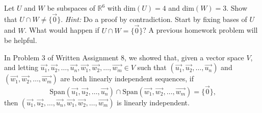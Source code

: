 \documentclass[12pt]{article}
\newenvironment{problem}[2][Problem]
{
	\begin{trivlist} 
		\item[\hskip \labelsep {\bfseries #1 #2:}]
	}
{
	\end{trivlist}
	}
\newenvironment{solution}[1][Solution]
{
	\begin{trivlist} 
		\item[\hskip \labelsep {\itshape #1:}]
	}
	{
	\end{trivlist}
}
\begin{document}
\begin{problem}{1}
Let $U$ and $W$ be subspaces of $\mathbb{R}^6$ with dim$(U)=4$ and dim$(W)=3$. Show that $U\cap W \neq \{ \vec{0} \}$.
\newline
\noindent
{\it Hint:} Do a proof by contradiction. Start by fixing bases of $U$ and $W$. What would happen if $U\cap W = \{\vec{0}\}$? A previous homework problem will be helpful.

\noindent
\newline
\newline
\begin{solution}
In Problem 3 of Written Assignment 8, we showed that, given a vector space $V$, and letting $\vec{u_1},\vec{u_2}, \dots , \vec{u_n},\vec{w_1},\vec{w_2}, \dots , \vec{w_m} \in V$ such that $(\vec{u_1},\vec{u_2}, \dots , \vec{u_n})$ and $(\vec{w_1},\vec{w_2}, \dots , \vec{w_m})$ are both linearly independent sequences, if
\[
\text{Span}(\vec{u_1},\vec{u_2}, \dots , \vec{u_n}) \cap \text{Span}(\vec{w_1},\vec{w_2}, \dots , \vec{w_m}) = \{\vec{0}\}\text{,}
\]
then $(\vec{u_1},\vec{u_2}, \dots , \vec{u_n}, \vec{w_1},\vec{w_2}, \dots , \vec{w_m})$ is linearly independent.


\end{solution}
\end{problem}
\end{document}
